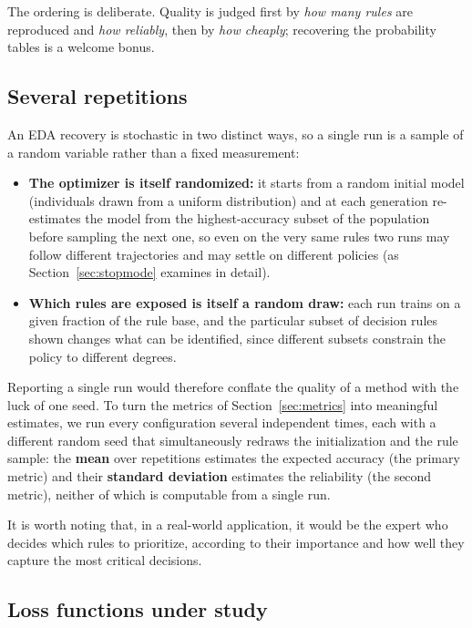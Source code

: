 The ordering is deliberate. Quality is judged first by \emph{how many
rules} are reproduced and \emph{how reliably}, then by \emph{how
cheaply}; recovering the probability tables is a welcome bonus.

\subsection{Several repetitions}
\label{sec:repetitions}

An EDA recovery is stochastic in two distinct ways, so a single run is a sample
of a random variable rather than a fixed measurement:
\begin{itemize}
  \item \textbf{The optimizer is itself randomized:} it starts from a random
        initial model (individuals drawn from a uniform distribution) and at each
        generation re-estimates the model from the highest-accuracy subset of the
        population before sampling the next one, so even on the very same rules
        two runs may follow different trajectories and may settle on different
        policies (as Section~\ref{sec:stopmode} examines in detail).
  \item \textbf{Which rules are exposed is itself a random draw:} each run trains
        on a given fraction of the rule base, and the particular subset of
        decision rules shown changes what can be identified, since different
        subsets constrain the policy to different degrees.
\end{itemize}
Reporting a single run would therefore conflate
the quality of a method with the luck of one seed. To turn the metrics of
Section~\ref{sec:metrics} into meaningful estimates, we run every configuration
several independent times, each with a different random seed that simultaneously
redraws the initialization and the rule sample: the \textbf{mean} over
repetitions estimates the expected accuracy (the primary metric) and their
\textbf{standard deviation} estimates the reliability (the second metric),
neither of which is computable from a single run.

It is worth noting that, in a real-world application, it would be the expert who
decides which rules to prioritize, according to their importance and how well
they capture the most critical decisions.

\subsection{Loss functions under study}
\label{sec:losses}

